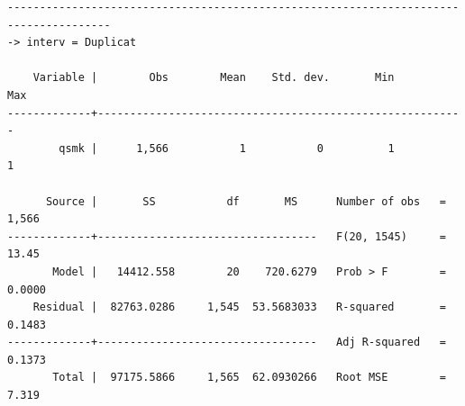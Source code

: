 \documentclass[
  10pt,
  a4paper,
]{book}
\begin{document}
\begin{verbatim}
--------------------------------------------------------------------------------------
-> interv = Duplicat

    Variable |        Obs        Mean    Std. dev.       Min        Max
-------------+---------------------------------------------------------
        qsmk |      1,566           1           0          1          1

      Source |       SS           df       MS      Number of obs   =     1,566
-------------+----------------------------------   F(20, 1545)     =     13.45
       Model |   14412.558        20    720.6279   Prob > F        =    0.0000
    Residual |  82763.0286     1,545  53.5683033   R-squared       =    0.1483
-------------+----------------------------------   Adj R-squared   =    0.1373
       Total |  97175.5866     1,565  62.0930266   Root MSE        =     7.319


\end{verbatim}
\end{document}
